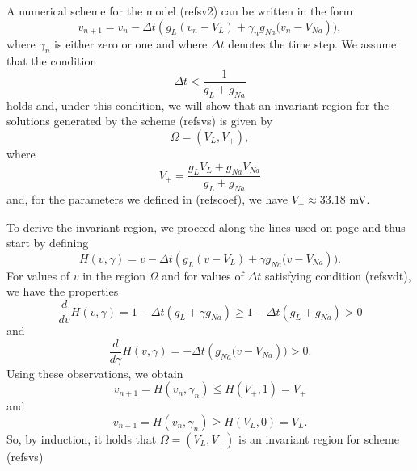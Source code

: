 A numerical scheme for the model (ref{sv2}) can be written
in the form
\begin{equation}
v_{n+1}=v_{n}-\Delta t\left(  g_{L}\left(  v_{n}-V_{L}\right)  +\gamma
_{n}g_{Na}(v_{n}-V_{Na}\right)  ), \label{svs}
\end{equation}
where $\gamma_{n}$ is either zero or one and where $\Delta t$ denotes the
time step. We assume that the condition
\begin{equation}
\Delta t<\frac{1}{g_{L}+g_{Na}} \label{svdt}
\end{equation}
holds and, under this condition, we will show that an invariant region for the solutions
generated by the scheme (ref{svs}) is given by
\begin{equation}
\Omega=\left(  V_{L},V_{+}\right)  , \label{inv_region_2}
\end{equation}
where
\[
V_{+}=\frac{g_{L}V_{L}+g_{Na}V_{Na}}{g_{L}+g_{Na}}
\]
and, for the parameters we defined in (ref{scoef}), we have
$V_{+}\approx 33.18$ mV.

To derive the invariant region, we proceed along the lines used on
page \pageref{vdt} and thus start by defining
\[
H(v,\gamma)=v-\Delta t\left(  g_{L}\left(  v-V_{L}\right)  +\gamma
g_{Na}(v-V_{Na}\right)  ).
\]
For values of $v$ in the region $\Omega$ and for values of $\Delta t$
satisfying condition (ref{svdt}), we have the properties
\[
\frac{d}{dv}H(v,\gamma)=1-\Delta t\left(  g_{L}+\gamma g_{Na}\right)
\geqslant1-\Delta t\left(  g_{L}+g_{Na}\right)  >0
\]
and
\[
\frac{d}{d\gamma}H(v,\gamma)=-\Delta t\left(  g_{Na}(v-V_{Na}\right)  )>0.
\]
Using these observations, we obtain
\[
v_{n+1}=H(v_{n},\gamma_{n})\leqslant H(V_{+},1)=V_{+}
\]
and
\[
v_{n+1}=H(v_{n},\gamma_{n})\geqslant H(V_{L},0)=V_{L}.
\]
So, by induction, it holds that $\Omega=\left(  V_{L},V_{+}\right)  $ is an
invariant region for scheme (ref{svs})


